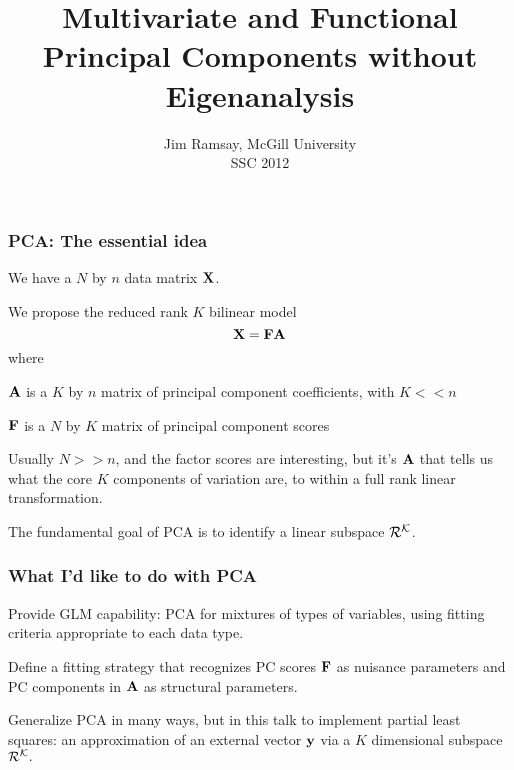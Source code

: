\documentclass[11pt]{beamer}
\title{Multivariate and Functional Principal Components without Eigenanalysis}
\author{Jim Ramsay, McGill University \\ SSC 2012}
\date{}
\begin{document}
\begin{frame}

\maketitle

\end{frame}


\begin{frame}

\frametitle{PCA: The essential idea}

\bi
  \item We have a $N$ by $n$ data matrix $\mbox{\bf X}$.
  \item We propose the reduced rank $K$ bilinear model
  \[
    \mbox{\bf X} = \mbox{\bf F} \mbox{\bf A}
  \]
  where
    \bi
      \item $\mbox{\bf A}$ is a $K$ by $n$ matrix of principal component coefficients, with $K << n$
      \item $\mbox{\bf F}$ is a $N$ by $K$ matrix of principal component scores
    \ei
  \item Usually $N >> n$, and the factor scores are interesting, but it's $\mbox{\bf A}$ that tells
  us what the core $K$ components of variation are, to within a full rank linear transformation.
  \item The fundamental goal of PCA is to identify a linear subspace $\cal{R}^K$.
\ei

\end{frame}


\begin{frame}

\frametitle{What I'd like to do with PCA}

\bi
  \item Provide GLM capability: PCA for mixtures of types of variables, using fitting criteria
  appropriate to each data type.
  \item Define a fitting strategy that recognizes PC scores $\mbox{\bf F}$ as nuisance parameters
  and PC components in $\mbox{\bf A}$ as structural parameters.
  \item Generalize PCA in many ways, but in this talk to implement partial least squares: an approximation of an external vector $\mbox{\bf y}$ via a $K$ dimensional subspace $\cal{R}^K.$
\ei

\end{frame}
\end{document}
